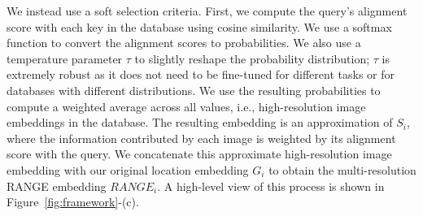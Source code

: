 We instead use a soft selection criteria. First, we compute the query's alignment score with each key in the database using cosine similarity. We use a softmax function to convert the alignment scores to probabilities. We also use a temperature parameter $\tau$ to slightly reshape the probability distribution; $\tau$ is extremely robust as it does not need to be fine-tuned for different tasks or for databases with different distributions. We use the resulting probabilities to compute a weighted average across all values, i.e., high-resolution image embeddings in the database. The resulting embedding is an approximation of $S_i$, where the information contributed by each image is weighted by its alignment score with the query. We concatenate this approximate high-resolution image embedding with our original location embedding $G_i$ to obtain the multi-resolution RANGE embedding $RANGE_i$. A high-level view of this process is shown in Figure~\ref{fig:framework}-(c). 

